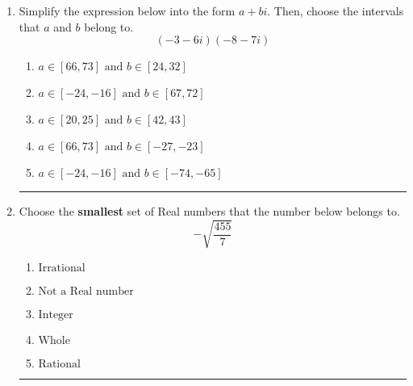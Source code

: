 \documentclass[14pt]{extbook}
\newcommand{\litem}[1]{\item#1\hspace*{-1cm}\rule{\textwidth}{0.4pt}}
\begin{document}
\begin{enumerate}
{\begin{enumerate}[label=\Alph*.]
\end{enumerate} }
\litem{
Simplify the expression below into the form $a+bi$. Then, choose the intervals that $a$ and $b$ belong to.\[ (-3 - 6 i)(-8 - 7 i) \]\begin{enumerate}[label=\Alph*.]
\item \( a \in [66, 73] \text{ and } b \in [24, 32] \)
\item \( a \in [-24, -16] \text{ and } b \in [67, 72] \)
\item \( a \in [20, 25] \text{ and } b \in [42, 43] \)
\item \( a \in [66, 73] \text{ and } b \in [-27, -23] \)
\item \( a \in [-24, -16] \text{ and } b \in [-74, -65] \)

\end{enumerate} }
\litem{
Choose the \textbf{smallest} set of Real numbers that the number below belongs to.\[ -\sqrt{\frac{455}{7}} \]\begin{enumerate}[label=\Alph*.]
\item \( \text{Irrational} \)
\item \( \text{Not a Real number} \)
\item \( \text{Integer} \)
\item \( \text{Whole} \)
\item \( \text{Rational} \)

\end{enumerate} }
\end{enumerate}
\end{document}
